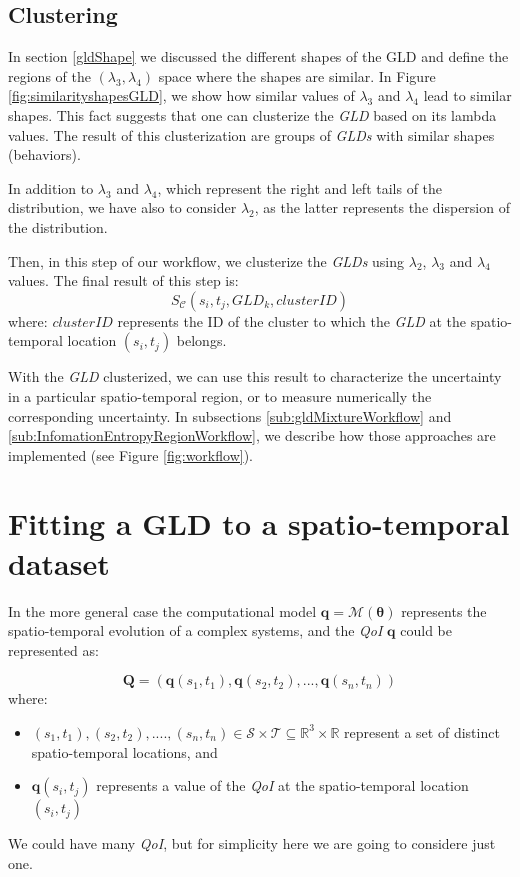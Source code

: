 \subsection{Clustering}
In section \ref{gldShape} we discussed the different shapes of the GLD and define the regions of the $(\lambda_{3}, \lambda_{4})$ space where the shapes are similar. In Figure \ref{fig:similarityshapesGLD}, we show how  similar values of $\lambda_{3}$ and $\lambda_{4}$ lead to similar shapes. This fact suggests that one can clusterize the \textit{GLD} based on its lambda values. The  result of this clusterization are groups of \textit{GLDs} with similar shapes (behaviors).

In addition to $\lambda_{3}$ and $\lambda_{4}$, which  represent the right and left tails of the distribution, we have also to consider $\lambda_{2}$, as the latter represents the dispersion of the distribution. 

Then, in this step of our workflow, we clusterize the \textit{GLDs} using $\lambda_{2}$, $\lambda_{3}$ and $\lambda_{4}$ values. The final result of this step is:
\begin{equation}
S_{\mathcal{C}}(s_{i},t_{j},GLD_{k},clusterID)
\end{equation}
where:
$clusterID$ represents the ID of the cluster to which the \textit{GLD} at the spatio-temporal location $(s_{i},t_{j})$ belongs.

With the \textit{GLD} clusterized, we can use this result to characterize the uncertainty in a particular spatio-temporal region, or to measure numerically the corresponding uncertainty. In subsections \ref{sub:gldMixtureWorkflow} and \ref{sub:InfomationEntropyRegionWorkflow}, we describe how those approaches are implemented (see Figure \ref{fig:workflow}).

\section{Fitting a GLD to a spatio-temporal dataset}
In the more general case the computational model $\bm{q}=\mathcal{M}(\bm{\theta})$ represents the spatio-temporal evolution of a complex systems, and the \textit{QoI} $\bm{q}$ could be represented as:  

\begin{equation} \label{eq:spatio_temporal}
\mathbf{Q} = (\mathbf{q}(s_{1},t_{1}),\mathbf{q}(s_{2},t_{2}),...,\mathbf{q}(s_{n},t_{n}))  
\end{equation}
where:
\begin{itemize}
\item $(s_{1},t_{1}),(s_{2},t_{2}),....,(s_{n},t_{n}) \in \mathcal{S} \times \mathcal{T}\subseteq\mathbb{R}^{3}\times\mathbb{R}$ represent a set of distinct spatio-temporal locations, and
\item $\mathbf{q}(s_{i},t_{j})$ represents a value of the \textit{QoI} at the spatio-temporal location $(s_{i},t_{j})$
\end{itemize}
We could have many \textit{QoI}, but for simplicity here we are going to considere just one.

